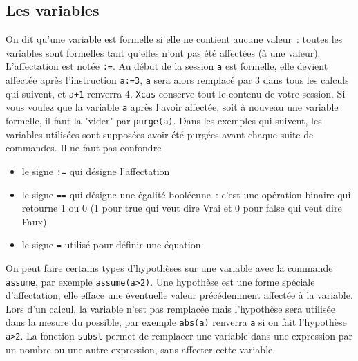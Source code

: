 \documentclass{article}
\begin{document}
\begin{giacjshere}
\subsection{Les variables}
%
On dit qu'une variable est formelle si elle ne contient aucune valeur~: 
toutes les variables sont formelles tant qu'elles n'ont pas \'et\'e
affect\'ees (\`a une valeur).
L'affectation est not\'ee \verb|:=|. Au d\'ebut 
de la session  \verb|a| 
est formelle, elle devient affect\'ee apr\`es l'instruction 
\verb|a:=3|, \verb|a| sera alors remplac\'e par 3 dans tous
les calculs qui suivent, et \verb|a+1| renverra 4. 
{\tt Xcas} conserve tout le contenu de votre session. Si vous voulez que la variable 
\verb|a| apr\`es l'avoir affect\'ee, soit \`a nouveau une variable formelle, il
faut la "vider" par \verb|purge(a)|. Dans les exemples qui suivent, les 
variables utilis\'ees sont suppos\'ees avoir \'et\'e purg\'ees avant chaque
suite de commandes.
\noindent
Il ne faut pas confondre
\begin{itemize}
\item le signe \verb|:=| qui d\'esigne l'affectation
\item le signe \verb|==| qui d\'esigne une \'egalit\'e
  bool\'eenne~: c'est une op\'eration binaire qui retourne 1 ou 0 (1 pour true
qui veut dire Vrai et 0 pour false qui veut dire Faux) 
\item le signe \verb|=| utilis\'e pour d\'efinir une \'equation.
\end{itemize}
On peut faire certains types d'hypoth\`eses sur une variable avec
la commande \verb|assume|, par exemple \verb|assume(a>2)|. Une
hypoth\`ese est une forme sp\'eciale d'affectation, elle efface
une \'eventuelle valeur pr\'ec\'edemment affect\'ee \`a la variable.
Lors d'un calcul, la variable n'est pas remplac\'ee mais
l'hypoth\`ese sera utilis\'ee dans la mesure du possible, par exemple
\verb|abs(a)| renverra \verb|a| si on fait l'hypoth\`ese \verb|a>2|.
La fonction \verb|subst| permet de remplacer une variable dans une
expression par un nombre ou une autre expression, 
sans affecter cette variable.


\end{giacjshere}
\end{document}
